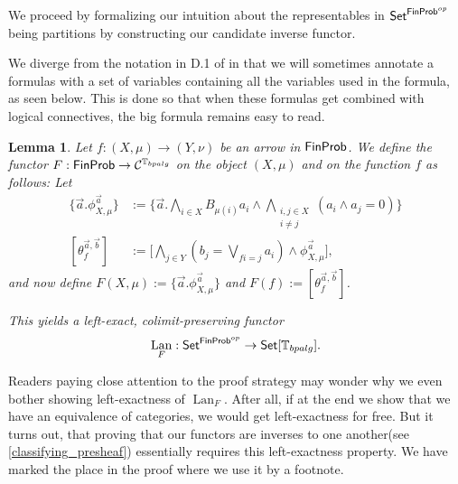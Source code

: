 \documentclass[a4paper]{amsproc}
\theoremstyle{plain}
\newtheorem{lemma}[theorem]{Lemma}
\theoremstyle{definition}
\theoremstyle{remark}
\numberwithin{equation}{section}
\DeclareMathOperator{\Lan}{Lan}
\newcommand{\Set}{\textup{\textsf{Set}}}
\newcommand{\FinProb}{\textup{\textsf{FinProb}}}
\begin{document}
We proceed by formalizing our intuition about the representables in $\Set^{\FinProb^{op}}$ being partitions by constructing our candidate inverse functor.

We diverge from the notation in D.1 of \cite{elephant} in that we will sometimes annotate a formulas with a set of variables containing all the variables used in the formula, as seen below. This is done so that when these formulas get combined with logical connectives, the big formula remains easy to read.

\begin{lemma} \label{inverse}
Let $f: (X,\mu) \to (Y, \nu)$ be an arrow in $\FinProb$. We define the functor $F: \FinProb \to \mathcal{C}^{\mathbb{T}_{bpalg}}$ on the object $(X,\mu)$ and on the function $f$ as follows: Let
\begin{align*}
\{\vec{a} . \phi_{X,\mu}^{\vec{a}}\} &:= \Bigg \{ \vec{a} . \bigwedge_{i \in X} B_{\mu(i)} a_i \wedge \bigwedge_{\substack{i,j \in X \\ i \neq j}} (a_i \wedge a_j = 0) \Bigg \} \\
[\theta_f^{\vec{a}, \vec{b}}] &:= \Bigg [ \bigwedge_{j \in Y} (b_j = \bigvee_{f i = j} a_i) \wedge \phi_{X,\mu}^{\vec{a}} \Bigg] ,
\end{align*}
and now define $F(X,\mu) := \{\vec{a} . \phi_{X,\mu}^{\vec{a}}\}$ and $F(f) := [\theta_f^{\vec{a}, \vec{b}}]$.

This yields a left-exact, colimit-preserving functor
\[
    \Lan_F: \Set^{\FinProb^{op}} \to \Set[\mathbb{T}_{bpalg}] .
\]
\end{lemma}

Readers paying close attention to the proof strategy may wonder why we even bother showing left-exactness of $\Lan_F$. After all, if at the end we show that we have an equivalence of categories, we would get left-exactness for free. But it turns out, that proving that our functors are inverses to one another(see \ref{classifying_presheaf}) essentially requires this left-exactness property. We have marked the place in the proof where we use it by a footnote.
\end{document}
